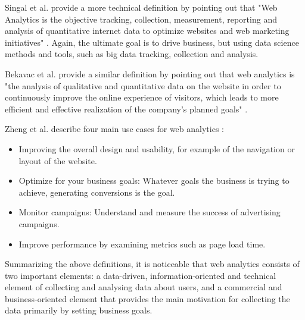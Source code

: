 Singal et al. provide a more technical definition by pointing out that "Web Analytics is the objective tracking, collection, measurement, reporting and analysis of quantitative internet data to optimize websites and web marketing initiatives" \cite{2014Singal}.
Again, the ultimate goal is to drive business, but using data science methods and tools, such as big data tracking, collection and analysis.

Bekavac et al. provide a similar definition by pointing out that web analytics is "the analysis of qualitative and quantitative data on the website in order to continuously improve the online experience of visitors, which leads to more efficient and effective realization of the company's planned goals" \cite{2015Bekavac}.





Zheng et al. describe four main use cases for web analytics \cite{2015Zheng}:

\begin{itemize}
\item Improving the overall design and usability, for example of the navigation or layout of the website.
\item Optimize for your business goals: Whatever goals the business is trying to achieve, generating conversions is the goal.
\item Monitor campaigns: Understand and measure the success of advertising campaigns.
\item Improve performance by examining metrics such as page load time.
\end{itemize}

Summarizing the above definitions, it is noticeable that web analytics consists of two important elements: a data-driven, information-oriented and technical element of collecting and analysing data about users, and a commercial and business-oriented element that provides the main motivation for collecting the data primarily by setting business goals.


